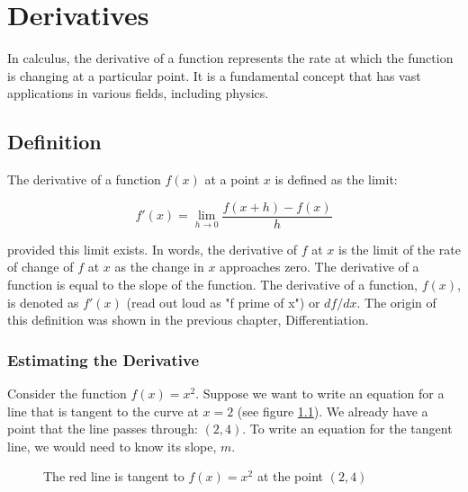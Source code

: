 \chapter{Derivatives}

In calculus, the derivative of a function represents the rate at which the 
function is changing at a particular point. It is a fundamental concept that 
has vast applications in various fields, including physics.

\section{Definition}

The derivative of a function $f(x)$ at a point $x$ is defined as the limit:

\begin{equation}
f'(x) = \lim_{{h \to 0}} \frac{f(x+h) - f(x)}{h}
\end{equation}

provided this limit exists. In words, the derivative of $f$ at $x$ is the 
limit of the rate of change of $f$ at $x$ as the change in $x$ approaches zero. 
The derivative of a function is equal to the slope  of the function. The 
derivative of a function, $f(x)$, is denoted as $f'(x)$ (read out loud as "f 
prime of x") or $df/dx$. The origin of this definition was shown in the 
previous chapter, Differentiation. 

\subsection{Estimating the Derivative}
Consider the function $f(x) = x^2$. Suppose we want to write an equation for a 
line that is tangent to the curve at $x = 2$ (see figure \ref{fig:tangent}). 
We already have a point that the line passes through: $(2, 4)$. To write an 
equation for the tangent line, we would need to know its slope, $m$. 

\begin{figure}[htbp]
    \centering
    \caption{The red line is tangent to $f(x) = x^2$ at the point $(2, 4)$}
    \label{fig:tangent}
\end{figure}

